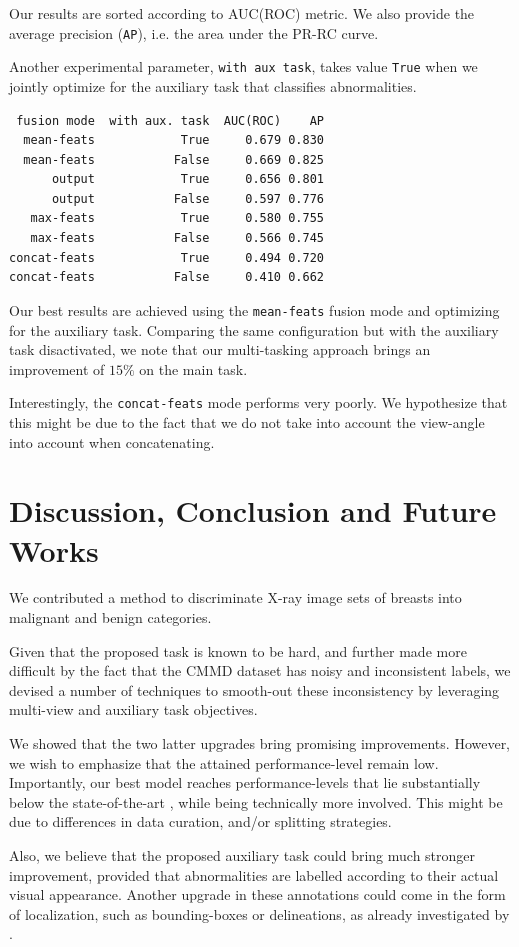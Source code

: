 \documentclass[11pt]{article}
\begin{document}
Our results are sorted according to AUC(ROC) metric.
We also provide the average precision (\texttt{AP}), i.e. the area under the PR-RC curve.

Another experimental parameter, \texttt{with aux task}, takes value \texttt{True} when we jointly optimize for the
auxiliary task that classifies abnormalities.

\begin{verbatim}
 fusion mode  with aux. task  AUC(ROC)    AP
  mean-feats            True     0.679 0.830
  mean-feats           False     0.669 0.825
      output            True     0.656 0.801
      output           False     0.597 0.776
   max-feats            True     0.580 0.755
   max-feats           False     0.566 0.745
concat-feats            True     0.494 0.720
concat-feats           False     0.410 0.662
\end{verbatim}


Our best results are achieved using the \texttt{mean-feats} fusion mode and
optimizing for the auxiliary task.
Comparing the same configuration but with the auxiliary task disactivated,
we note that our multi-tasking approach brings an improvement of \(15\%\) on the main task.

Interestingly, the \texttt{concat-feats} mode performs very poorly.
We hypothesize that this might be due to the fact
that we do not take into account the view-angle into account when
concatenating.

\section{Discussion, Conclusion and Future Works}
\label{sec:org565de16}

We contributed a method to discriminate X-ray image sets of breasts into malignant and benign
categories.

Given that the proposed task is known to be hard, and further made more difficult by
the fact that the CMMD dataset has noisy and inconsistent labels,
we devised a number of techniques to smooth-out these inconsistency by
leveraging multi-view and auxiliary task objectives.

We showed that the two latter upgrades bring promising improvements.
However, we wish to emphasize that the attained performance-level remain low.
Importantly, our best model reaches performance-levels that lie substantially
below the state-of-the-art \autocite{tardy22}, while being technically more involved.
This might be due to differences in data curation, and/or splitting strategies.

Also, we believe that the proposed auxiliary task could bring much stronger
improvement, provided that abnormalities are labelled according to their actual
visual appearance. Another upgrade in these annotations could come in the form
of localization, such as bounding-boxes or delineations, as already investigated by \autocite{tang19}.



\printbibliography
\end{document}
